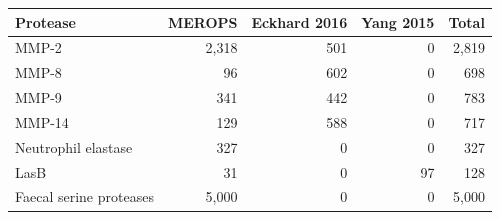 \begin{tabular}{@{}lrrrr@{}}\toprule
Protease & MEROPS & Eckhard 2016 & Yang 2015 & Total \\\midrule
MMP-2 & 2{,}318 & 501 & 0 & 2{,}819 \\
MMP-8 & 96 & 602 & 0 & 698 \\
MMP-9 & 341 & 442 & 0 & 783 \\
MMP-14 & 129 & 588 & 0 & 717 \\
Neutrophil elastase & 327 & 0 & 0 & 327 \\
LasB & 31 & 0 & 97 & 128 \\
Faecal serine proteases & 5{,}000 & 0 & 0 & 5{,}000 \\
\bottomrule\end{tabular}
